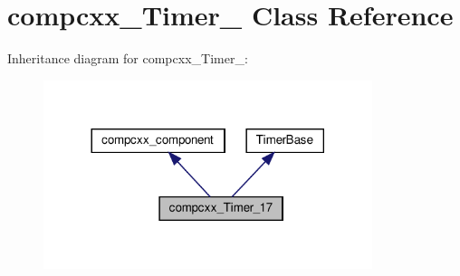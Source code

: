 \hypertarget{classcompcxx__Timer__17}{}\section{compcxx\+\_\+\+Timer\+\_ Class Reference}
\label{classcompcxx__Timer__17}


Inheritance diagram for compcxx\+\_\+\+Timer\+\_\+:\nopagebreak
\begin{figure}[H]
\begin{center}
\leavevmode
\includegraphics[width=272pt]{classcompcxx__Timer__17__inherit__graph}
\end{center}
\end{figure}


